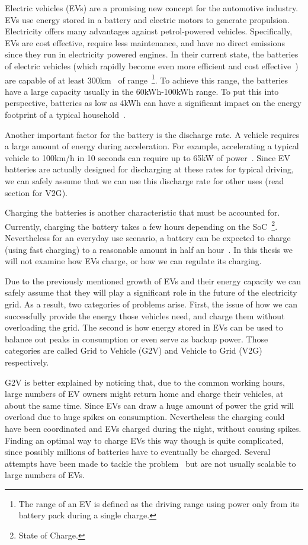 Electric vehicles (EVs) are a promising new concept for the automotive industry. EVs use energy stored in a battery and electric motors to generate propulsion. Electricity offers many advantages against petrol-powered vehicles. Specifically, EVs are cost effective, require less maintenance, and have no direct emissions since they run in electricity powered engines. In their current state, the batteries of electric vehicles (which rapidly become even more efficient and cost effective~\cite{nykvist2015rapidly}) are capable of at least 300km~\cite{globalev2016}\cite{young2013electric} of range~\footnote{The range of an EV is defined as the driving range using power only from its battery pack during a single charge.}. To achieve this range, the batteries have a large capacity usually in the 60kWh-100kWh range. To put this into perspective, batteries as low as 4kWh can have a significant impact on the energy footprint of a typical household~\cite{vytelingum2010agent}.

Another important factor for the battery is the discharge rate. A vehicle requires a large amount of energy during acceleration. For example, accelerating a typical vehicle to 100km/h in 10 seconds can require up to 65kW of power~\cite{young2013electric}. Since EV batteries are actually designed for discharging at these rates for typical driving, we can safely assume that we can use this discharge rate for other uses (read section for V2G).

Charging the batteries is another characteristic that must be accounted for. Currently, charging the battery takes a few hours depending on the SoC~\footnote{State of Charge.}. Nevertheless for an everyday use scenario, a battery can be expected to charge (using fast charging) to a reasonable amount in half an hour~\cite{young2013electric}. In this thesis we will not examine how EVs charge, or how we can regulate its charging.

Due to the previously mentioned growth of EVs and their energy capacity we can safely assume that they will play a significant role in the future of the electricity grid. As a result, two categories of problems arise. First, the issue of how we can successfully provide the energy those vehicles need, and charge them without overloading the grid. The second is how energy stored in EVs can be used to balance out peaks in consumption or even serve as backup power. Those categories are called Grid to Vehicle (G2V) and Vehicle to Grid (V2G) respectively.

G2V is better explained by noticing that, due to the common working hours, large numbers of EV owners might return home and charge their vehicles, at about the same time. Since EVs can draw a huge amount of power the grid will overload due to huge spikes on consumption. Nevertheless the charging could have been coordinated and EVs charged during the night, without causing spikes. Finding an optimal way to charge EVs this way though is quite complicated, since possibly millions of batteries have to eventually be charged. Several attempts have been made to tackle the problem~\cite{gan2013optimal}\cite{valogianni2014effective} but are not usually scalable to large numbers of EVs.

